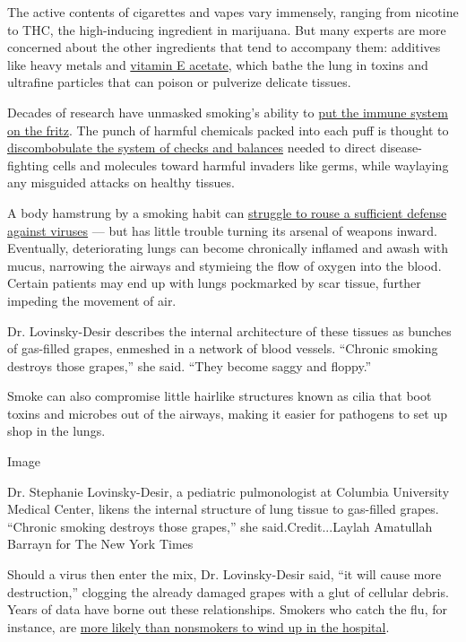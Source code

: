The active contents of cigarettes and vapes vary immensely, ranging from
nicotine to THC, the high-inducing ingredient in marijuana. But many
experts are more concerned about the other ingredients that tend to
accompany them: additives like heavy metals and
\href{https://www.nytimes3xbfgragh.onion/2019/11/08/health/vaping-illness-cdc.html}{vitamin
E acetate}, which bathe the lung in toxins and ultrafine particles that
can poison or pulverize delicate tissues.

Decades of research have unmasked smoking's ability to
\href{https://www.cancer.org/cancer/cancer-causes/tobacco-and-cancer/health-risks-of-smoking-tobacco.html}{put
the immune system on the fritz}. The punch of harmful chemicals packed
into each puff is thought to
\href{https://www.ncbi.nlm.nih.gov/pmc/articles/PMC5352117/}{discombobulate
the system of checks and balances} needed to direct disease-fighting
cells and molecules toward harmful invaders like germs, while waylaying
any misguided attacks on healthy tissues.

A body hamstrung by a smoking habit can
\href{https://pubmed.ncbi.nlm.nih.gov/30789425/}{struggle to rouse a
sufficient defense against viruses} --- but has little trouble turning
its arsenal of weapons inward. Eventually, deteriorating lungs can
become chronically inflamed and awash with mucus, narrowing the airways
and stymieing the flow of oxygen into the blood. Certain patients may
end up with lungs pockmarked by scar tissue, further impeding the
movement of air.

Dr. Lovinsky-Desir describes the internal architecture of these tissues
as bunches of gas-filled grapes, enmeshed in a network of blood vessels.
``Chronic smoking destroys those grapes,'' she said. ``They become saggy
and floppy.''

Smoke can also compromise little hairlike structures known as cilia that
boot toxins and microbes out of the airways, making it easier for
pathogens to set up shop in the lungs.

Image

Dr. Stephanie Lovinsky-Desir, a pediatric pulmonologist at Columbia
University Medical Center, likens the internal structure of lung tissue
to gas-filled grapes. ``Chronic smoking destroys those grapes,'' she
said.Credit...Laylah Amatullah Barrayn for The New York Times

Should a virus then enter the mix, Dr. Lovinsky-Desir said, ``it will
cause more destruction,'' clogging the already damaged grapes with a
glut of cellular debris. Years of data have borne out these
relationships. Smokers who catch the flu, for instance, are
\href{https://pubmed.ncbi.nlm.nih.gov/30789425/}{more likely than
nonsmokers to wind up in the hospital}.

